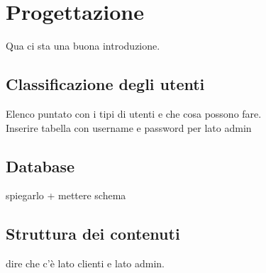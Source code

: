 \section{Progettazione}
Qua ci sta una buona introduzione.

\subsection{Classificazione degli utenti}
Elenco puntato con i tipi di utenti e che cosa possono fare.
\\ Inserire tabella con username e password per lato admin

\subsection{Database}
spiegarlo + mettere schema

\subsection{Struttura dei contenuti}
dire che c'è lato clienti e lato admin.

